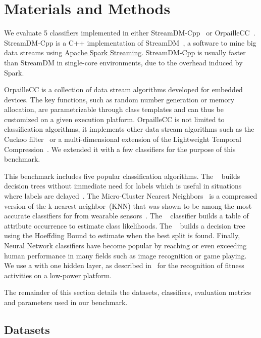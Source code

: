 \section{Materials and Methods}
We evaluate 5 classifiers implemented in either StreamDM-Cpp~\cite{StreamDM-CPP}
or OrpailleCC~\cite{OrpailleCC}.  StreamDM-Cpp is a C++ implementation of
StreamDM~\cite{StreamDM}, a software to mine big data streams using
\href{https://spark.apache.org/streaming/}{Apache Spark Streaming}. StreamDM-Cpp
is usually faster than StreamDM in single-core environments, due to the overhead
induced by Spark.

OrpailleCC is a collection of data stream algorithms developed for embedded
devices. The key functions, such as random number generation or memory
allocation, are parametrizable through class templates and can thus be
customized on a given execution platform.  OrpailleCC is not limited to
classification algorithms, it implements other data stream algorithms such as
the Cuckoo filter~\cite{cuckoo} or a multi-dimensional extension of the
Lightweight Temporal Compression~\cite{multi-ltc}. We extended it with a few
classifiers for the purpose of this benchmark.

This benchmark includes five popular classification algorithms.  The
\mondrianforest~\cite{mondrian2014} builds decision trees without immediate need
for labels which is useful in situations where labels are
delayed~\cite{stream_learning_review}.  The Micro-Cluster Nearest
Neighbors~\cite{mc-nn} is a compressed version of the k-nearest neighbor~(KNN)
that was shown to be among the most accurate classifiers for \har from wearable
sensors~\cite{Janidarmian_2017}. The \naivebayes~\cite{naive_bayes} classifier
builds a table of attribute occurrence to estimate class likelihoods.  The
\hoeffdingtree~\cite{VFDT} builds a decision tree using the Hoeffding Bound to
estimate when the best split is found.  Finally, Neural Network classifiers have
become popular by reaching or even exceeding human performance in many fields
such as image recognition or game playing. We use a \FNN with one hidden layer,
as described in~\cite{omid_2019} for the recognition of fitness activities on a
low-power platform.

The remainder of this section details the datasets, classifiers, evaluation
metrics and parameters used in our benchmark.

\subsection{Datasets}
\label{sec:method-dataset}
